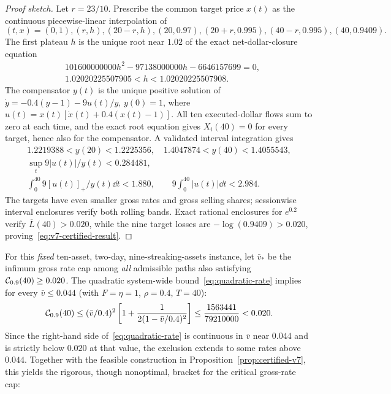 \documentclass[review,hidelinks,onefignum,onetabnum]{siamonline250211}
\begin{document}
\begin{proof}[Proof sketch]
Let $r=23/10$. Prescribe the common target price $x(t)$ as the continuous piecewise-linear interpolation of
\begin{equation}\label{eq:v7-knots}
(t,x)=(0,1),(r,h),(20-r,h),(20,0.97),(20+r,0.995),(40-r,0.995),(40,0.9409).
\end{equation}
The first plateau $h$ is the unique root near $1.02$ of the exact net-dollar-closure equation
\begin{equation}\label{eq:v7-root}
\begin{aligned}
&101600000000h^2-97138000000h-6646157699=0,\\
&1.02020225507905<h<1.02020225507908.
\end{aligned}
\end{equation}
The compensator $y(t)$ is the unique positive solution of
$\dot y=-0.4(y-1)-9u(t)/y$, $y(0)=1$, where
$u(t)=x(t)[\dot x(t)+0.4(x(t)-1)]$.
All ten executed-dollar flows sum to zero at each time, and the exact root equation gives $X_i(40)=0$ for every target, hence also for the compensator. A validated interval integration gives
\begin{equation}\label{eq:v7-bounds}
\begin{gathered}
1.2219388<y(20)<1.2225356,\quad
1.4047874<y(40)<1.4055543,\\
\sup_t9|u(t)|/y(t)<0.284481,\\
\int_0^{40}9[u(t)]_+/y(t)\dd t<1.880,\qquad
9\int_0^{40}|u(t)|\dd t<2.984.
\end{gathered}
\end{equation}
The targets have even smaller gross rates and gross selling shares; sessionwise interval enclosures verify both rolling bands. Exact rational enclosures for $e^{0.2}$ verify $\overline L(40)>0.020$, while the nine target losses are $-\log(0.9409)>0.020$, proving~\eqref{eq:v7-certified-result}.
\end{proof}
For this \emph{fixed} ten-asset, two-day, nine-streaking-assets instance, let $\bar v_*$ be the infimum gross rate cap among \emph{all} admissible paths also satisfying $\mathcal{C}_{0.9}(40)\ge0.020$. The quadratic system-wide bound~\eqref{eq:quadratic-rate} implies for every $\bar v\le 0.044$ (with $F=\eta=1$, $\rho=0.4$, $T=40$):
\[
\mathcal{C}_{0.9}(40)\le (\bar v/0.4)^2
\left[1+\frac{1}{2(1-\bar v/0.4)^2}\right]
\le \frac{1563441}{79210000}<0.020.
\]
Since the right-hand side of~\eqref{eq:quadratic-rate} is continuous in $\bar v$ near $0.044$ and is strictly below $0.020$ at that value, the exclusion extends to some rates above $0.044$. Together with the feasible construction in Proposition~\ref{prop:certified-v7}, this yields the rigorous, though nonoptimal, bracket for the critical gross-rate cap:
\end{document}
